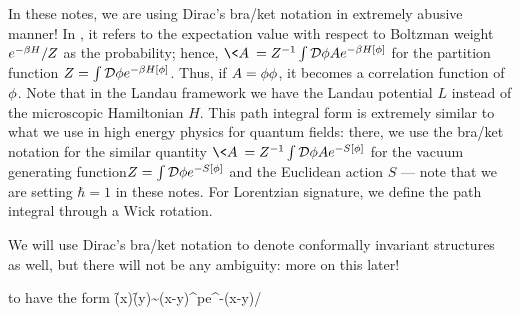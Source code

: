 \documentclass[12pt]{article}
\numberwithin{equation}{section}
\begin{document}
{	In these notes, we are using Dirac's bra/ket notation in extremely abusive manner! In , it refers to the expectation value with respect to Boltzman weight  $e^{-\beta H}/Z$ as the probability; hence, $\<A\>=Z^{-1}\int\cD\f A e^{-\b H[\f]}$ for the partition function $Z=\int\mathcal{D}\phi e^{-\beta H[\phi]}$. Thus, if $A=\phi\phi$, it becomes a correlation function of $\phi$. Note that in the Landau framework we have the Landau potential $L$ instead of the microscopic Hamiltonian $H$. This path integral form is extremely similar to what we use in high energy physics for quantum fields: there, we use the bra/ket notation for the similar quantity $\<A\>=Z^{-1}\int\cD\f A e^{-S[\f]}$ for the vacuum generating function\footnotemark $Z=\int\mathcal{D}\phi e^{-S[\phi]}$ and the Euclidean action $S$ --- note that we are setting $\hbar=1$ in these notes. For Lorentzian signature, we define the path integral through a Wick rotation. 
	
	We will use Dirac's bra/ket notation to denote conformally invariant structures as well, but there will not be any ambiguity: more on this later!
}   to have the form
\be 
\label{eq: correlation length}
\<\f(x)\f(y)\>\sim (x-y)^pe^{-(x-y)/\xi}
\ee 
\end{document}
